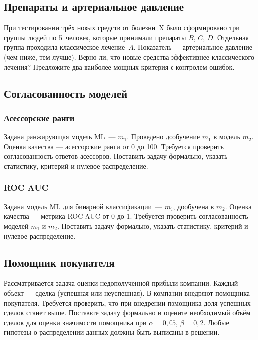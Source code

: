 \subsection{Препараты и артериальное давление}

При тестировании трёх новых средств от болезни~X было сформировано три группы людей по 5~человек, которые принимали препараты $B$, $C$, $D$. Отдельная группа проходила классическое лечение~$A$. Показатель --- артериальное давление (чем ниже, тем лучше). Верно ли, что новые средства эффективнее классического лечения? Предложите два наиболее мощных критерия с контролем ошибок.

\subsection{Согласованность моделей}

\subsubsection{Асессорские ранги}

Задана ранжирующая модель ML~--- $m_1$. Проведено дообучение $m_1$ в модель $m_2$. Оценка качества --- асессорские ранги от 0 до 100. Требуется проверить согласованность ответов асессоров. Поставить задачу формально, указать статистику, критерий и нулевое распределение.

\subsubsection{ROC AUC}

Задана модель ML для бинарной классификации~--- $m_1$, дообучена в $m_2$. Оценка качества --- метрика ROC AUC от 0 до 1. Требуется проверить согласованность моделей $m_1$ и $m_2$. Поставить задачу формально, указать статистику, критерий и нулевое распределение.

\subsection{Помощник покупателя}

Рассматривается задача оценки недополученной прибыли компании. Каждый объект --- сделка (успешная или неуспешная). В компании внедряют помощника покупателя. Требуется проверить, что при внедрении помощника доля успешных сделок станет выше. Поставьте задачу формально и оцените необходимый объём сделок для оценки значимости помощника при $\alpha=0{,}05$, $\beta=0{,}2$. Любые гипотезы о распределении данных должны быть выписаны в решении.

